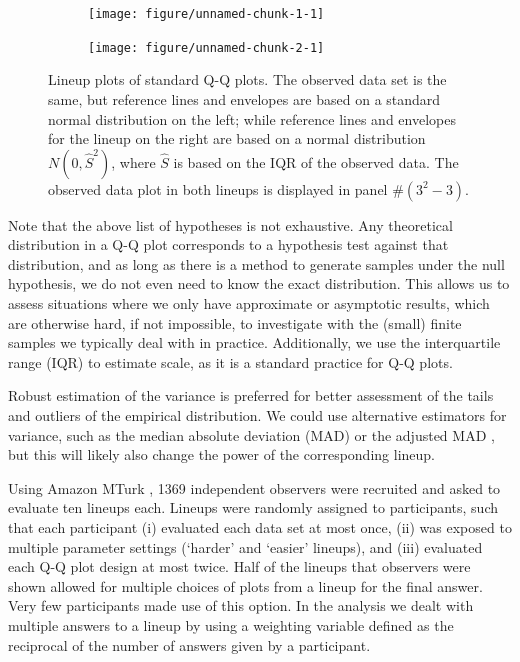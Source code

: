 \documentclass[12pt]{article}\usepackage[]{graphicx}\usepackage[]{color}
\newenvironment{knitrout}{}{} %
\begin{document}
\begin{figure}[hbt]

\begin{subfigure}{0.5\textwidth}
\begin{knitrout}
\color{fgcolor}
\texttt{[image: figure/unnamed-chunk-1-1]} 

\end{knitrout}
\end{subfigure}
\begin{subfigure}{0.5\textwidth}
\begin{knitrout}
\color{fgcolor}
\texttt{[image: figure/unnamed-chunk-2-1]} 

\end{knitrout}
\end{subfigure}
\caption{\label{fig:lps} Lineup plots of standard Q-Q plots. The observed data set is the same, but  reference lines and envelopes are based on a standard normal distribution on the left; while  reference lines and envelopes for the lineup on the right are based on a normal distribution $N(0, \widehat{S}^2)$, where $\widehat{S}$ is based on the IQR of the observed data.
The observed data plot in both lineups is displayed in panel \#$(3^2 - 3)$. }
\end{figure}
\afterpage{\clearpage}

Note that the above list of hypotheses is not exhaustive. Any theoretical distribution in a Q-Q plot corresponds to a  hypothesis test against that distribution, and as long as there is a method to generate samples under the null hypothesis, we do not even need to know the exact distribution. This allows us to assess situations where we only have approximate or asymptotic results, which are otherwise hard, if not impossible, to investigate  with the (small) finite samples we typically deal with in practice.
Additionally, we use the interquartile range (IQR) to estimate scale, as it is a standard practice for Q-Q plots.

Robust estimation of the variance is preferred for better assessment of the tails and outliers of the empirical distribution. We could use alternative estimators for variance, such as the median absolute deviation (MAD) or the adjusted MAD \citep{rousseeuw}, but this will likely also change the power of the corresponding lineup.

Using  Amazon MTurk \citep{amazon}, 1369 independent observers were recruited and asked to evaluate ten lineups each. Lineups were randomly assigned to participants, such that each participant
(i) evaluated each data set at most once, 
(ii) was exposed to multiple parameter settings (`harder' and `easier' lineups), and
(iii) evaluated each Q-Q plot design at most twice.
Half of the lineups that observers were shown allowed for multiple choices of plots from a lineup for the final answer. Very few participants made use of this option. In the analysis we dealt with multiple answers to a lineup by using a weighting variable defined as the reciprocal of the number of answers given by a participant.
\end{document}
